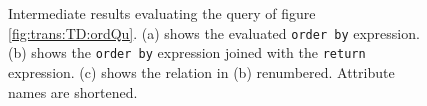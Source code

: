 \begin{myExample}
\begin{figure}[h]
\caption{Intermediate results evaluating the query of figure
\ref{fig:trans:TD:ordQu}. (a) shows the evaluated \texttt{order by} expression. (b) shows the \texttt{order by}
expression joined with the \texttt{return} expression. (c) shows the relation in (b) renumbered. Attribute names
are shortened.\label{fig:trans:TD:orderRes}}
\end{figure}


\end{myExample}
